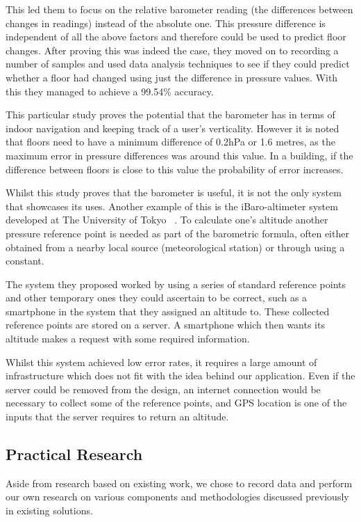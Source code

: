 \documentclass[12pt,a4paper]{report}
\begin{document}
This led them to focus on the relative barometer reading (the differences between changes in readings) instead of the absolute one. This pressure difference is independent of all the above factors and therefore could be used to predict floor changes. After proving this was indeed the case, they moved on to recording a number of samples and used data analysis techniques to see if they could predict whether a floor had changed using just the difference in pressure values. With this they managed to achieve a 99.54\% accuracy.

This particular study proves the potential that the barometer has in terms of indoor navigation and keeping track of a user's verticality. However it is noted that floors need to have a minimum difference of 0.2hPa or 1.6 metres, as the maximum error in pressure differences was around this value. In a building, if the difference between floors is close to this value the probability of error increases.

Whilst this study proves that the barometer is useful, it is not the only system that showcases its uses. Another example of this is the iBaro-altimeter system developed at The University of Tokyo ~\cite{baro22014}. To calculate one's altitude another pressure reference point is needed as part of the barometric formula, often either obtained from a nearby local source (meteorological station) or through using a constant.

The system they proposed worked by using a series of standard reference points and other temporary ones they could ascertain to be correct, such as a smartphone in the system that they assigned an altitude to. These collected reference points are stored on a server. A smartphone which then wants its altitude makes a request with some required information.

Whilst this system achieved low error rates, it requires a large amount of infrastructure which does not fit with the idea behind our application. Even if the server could be removed from the design, an internet connection would be necessary to collect some of the reference points, and GPS location is one of the inputs that the server requires to return an altitude.

\subsection{Practical Research}

Aside from research based on existing work, we chose to record data and perform our own research on various components and methodologies discussed previously in existing solutions.
\end{document}
